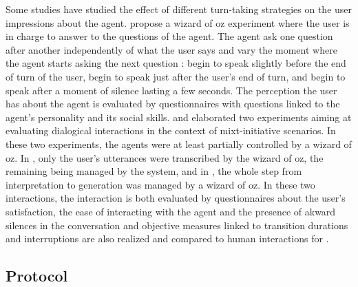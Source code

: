 Some studies have studied the effect of different turn-taking strategies on the user impressions about the agent. \cite{ter_maat_how_2010} propose a wizard of oz experiment where the user is in charge to answer to the questions of the agent. The agent ask one question after another independently of what the user says and vary the moment where the agent starts asking the next question : begin to speak slightly before the end of turn of the user, begin to speak just after the user's end of turn, and begin to speak after a moment of silence lasting a few seconds. The perception the user has about the agent is evaluated by questionnaires with questions linked to the agent's personality and its social skills. \cite{skantze_towards_2010} and \cite{de_vault_toward_2015} elaborated two experiments aiming at evaluating dialogical interactions in the context of mixt-initiative scenarios. In these two experiments, the agents were at least partially controlled by a wizard of oz. In \cite{skantze_towards_2010}, only the user's utterances were transcribed by the wizard of oz, the remaining being managed by the system, and in \cite{de_vault_toward_2015}, the whole step from interpretation to generation was managed by a wizard of oz. In these two interactions, the interaction is both evaluated by questionnaires about the user's satisfaction, the ease of interacting with the agent and the presence of akward silences in the conversation and objective measures linked to transition durations and interruptions are also realized and compared to human interactions for \cite{de_vault_toward_2015}. 

\subsection{Protocol}

